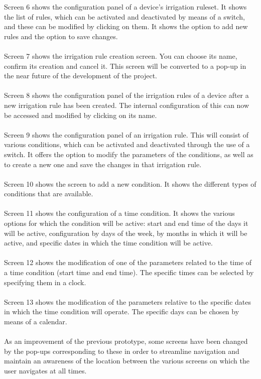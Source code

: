 \documentclass[11pt,a4paper]{article}
\begin{document}
\begin{itemize}
Screen 6 shows the configuration panel of a device's irrigation ruleset. It shows the list of rules, which can be activated and deactivated by means of a switch, and these can be modified by clicking on them. It shows the option to add new rules and the option to save changes.
\\ \\
Screen 7 shows the irrigation rule creation screen. You can choose its name, confirm its creation and cancel it. This screen will be converted to a pop-up in the near future of the development of the project. 
\\ \\
Screen 8 shows the configuration panel of the irrigation rules of a device after a new irrigation rule has been created. The internal configuration of this can now be accessed and modified by clicking on its name. 
\\ \\
Screen 9 shows the configuration panel of an irrigation rule. This will consist of various conditions, which can be activated and deactivated through the use of a switch. It offers the option to modify the parameters of the conditions, as well as to create a new one and save the changes in that irrigation rule. 
\\ \\
Screen 10 shows the screen to add a new condition. It shows the different types of conditions that are available. 
\\ \\
Screen 11 shows the configuration of a time condition. It shows the various options for which the condition will be active: start and end time of the days it will be active, configuration by days of the week, by months in which it will be active, and specific dates in which the time condition will be active. 
\\ \\
Screen 12 shows the modification of one of the parameters related to the time of a time condition (start time and end time). The specific times can be selected by specifying them in a clock. 
\\ \\
Screen 13 shows the modification of the parameters relative to the specific dates in which the time condition will operate. The specific days can be chosen by means of a calendar. 
\\ \\
As an improvement of the previous prototype, some screens have been changed by the pop-ups corresponding to these in order to streamline navigation and maintain an awareness of the location between the various screens on which the user navigates at all times. 


\end{itemize}
\end{document}
